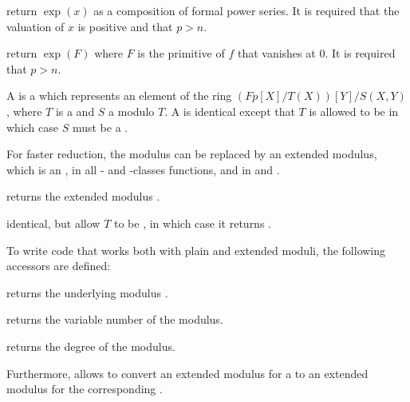 




 return $\exp(x)$
as a composition of formal power series.
It is required that the valuation of $x$ is positive and that $p>n$.


 return $\exp(F)$
where $F$ is the primitive of $f$ that vanishes at $0$.
It is required that $p>n$.



A  is a  which represents an element of the ring
$(Fp[X]/T(X))[Y]/S(X,Y)$, where $T$ is a  and $S$ a 
modulo $T$.  A  is identical except that $T$ is allowed to be
 in which case $S$ must be a .


For faster reduction, the modulus  can be replaced by an extended
modulus, which is an , in all - and -classes
functions, and in  and .

 returns the extended modulus
.

 identical, but allow $T$ to
be , in which case it returns .

To write code that works both with plain and extended moduli, the following
accessors are defined:

 returns the underlying modulus .

 returns the variable number of the modulus.

 returns the degree of the modulus.

Furthermore,  allows to convert an extended modulus for
a  to an extended modulus for the corresponding .

